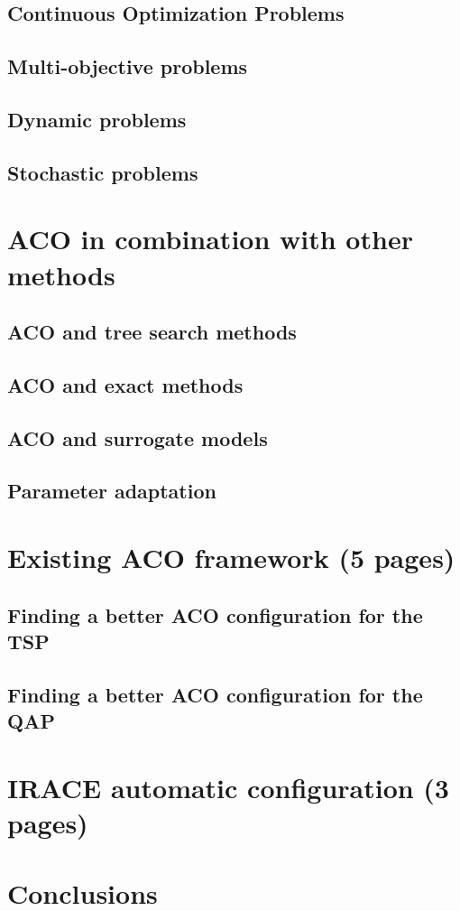 \documentclass[12pt]{article}
\begin{document}
\subsection{Continuous Optimization Problems}

\subsection{Multi-objective problems}

\subsection{Dynamic problems}

\subsection{Stochastic problems}

\section{ACO in combination with other methods}

\subsection{ACO and tree search methods}

\subsection{ACO and exact methods}

\subsection{ACO and surrogate models}

\subsection{Parameter adaptation}

\section{Existing ACO framework (5 pages)}

\subsection{Finding a better ACO configuration for the TSP}

\subsection{Finding a better ACO configuration for the QAP}

\section{IRACE automatic configuration (3 pages)}

\section{Conclusions}

\begin{thebibliography}{1}

\end{thebibliography}
\end{document}
